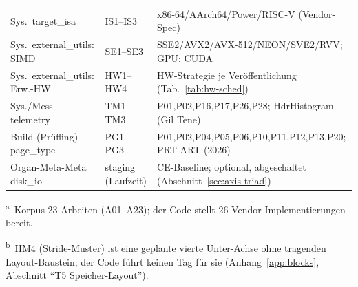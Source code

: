 \begin{nurlang}
\begin{table}[!htbp]
\begin{tabular}{@{}l l p{6.8cm}@{}}
    \midrule
    Sys.\ target\_isa & IS1--IS3 & x86-64/AArch64/Power/RISC-V (Vendor-Spec) \\
    Sys.\ external\_utils: SIMD & SE1--SE3 & SSE2/AVX2/AVX-512/NEON/SVE2/RVV\@; GPU\@: CUDA \\
    Sys.\ external\_utils: Erw.-HW & HW1--HW4 & HW-Strategie je Veröffentlichung (Tab.~\ref{tab:hw-sched}) \\
    Sys./Mess telemetry & TM1--TM3 & P01,P02,P16,P17,P26,P28; HdrHistogram (Gil Tene) \\
    Build (Prüfling) page\_type & PG1--PG3 & P01,P02,P04,P05,P06,P10,P11,P12,P13,P20; PRT-ART (2026) \\
    Organ-Meta-Meta disk\_io & staging (Laufzeit) & CE-Baseline; optional, abgeschaltet (Abschnitt~\ref{sec:axis-triad}) \\
    \bottomrule
  \end{tabular}

  \smallskip
  {\footnotesize \textsuperscript{a}~Korpus 23 Arbeiten (A01--A23); der Code stellt 26 Vendor-Implementierungen bereit.\par}
  {\footnotesize \textsuperscript{b}~HM4 (Stride-Muster) ist eine geplante vierte Unter-Achse ohne tragenden Layout-Baustein; der Code führt keinen Tag für sie (Anhang~\ref{app:blocks}, Abschnitt \enquote{T5 Speicher-Layout}).\par}
\end{table}
\end{nurlang}
